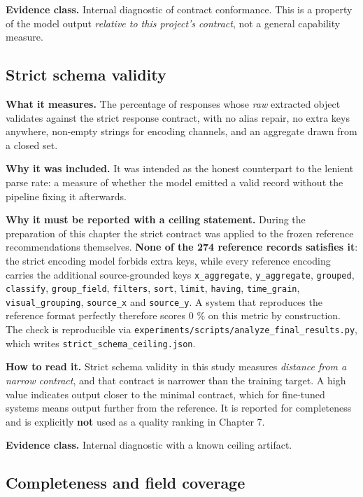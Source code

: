 \textbf{Evidence class.} Internal diagnostic of contract conformance. This is a property of the model output \emph{relative to this project's contract}, not a general capability measure.

\subsection{Strict schema validity}

\textbf{What it measures.} The percentage of responses whose \emph{raw} extracted object validates against the strict response contract, with no alias repair, no extra keys anywhere, non-empty strings for encoding channels, and an aggregate drawn from a closed set.

\textbf{Why it was included.} It was intended as the honest counterpart to the lenient parse rate: a measure of whether the model emitted a valid record without the pipeline fixing it afterwards.

\textbf{Why it must be reported with a ceiling statement.} During the preparation of this chapter the strict contract was applied to the frozen reference recommendations themselves. \textbf{None of the 274 reference records satisfies it}: the strict encoding model forbids extra keys, while every reference encoding carries the additional source-grounded keys \texttt{x\_aggregate}, \texttt{y\_aggregate}, \texttt{grouped}, \texttt{classify}, \texttt{group\_field}, \texttt{filters}, \texttt{sort}, \texttt{limit}, \texttt{having}, \texttt{time\_grain}, \texttt{visual\_grouping}, \texttt{source\_x} and \texttt{source\_y}. A system that reproduces the reference format perfectly therefore scores 0 \% on this metric by construction. The check is reproducible via \nolinkurl{experiments/scripts/analyze_final_results.py}, which writes \nolinkurl{strict_schema_ceiling.json}.

\textbf{How to read it.} Strict schema validity in this study measures \emph{distance from a narrow contract}, and that contract is narrower than the training target. A high value indicates output closer to the minimal contract, which for fine-tuned systems means output further from the reference. It is reported for completeness and is explicitly \textbf{not} used as a quality ranking in Chapter 7.

\textbf{Evidence class.} Internal diagnostic with a known ceiling artifact.

\subsection{Completeness and field coverage}

